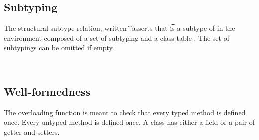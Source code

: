 \documentclass[a4paper,USenglish]{tex/lipics-v2016}
\begin{document}
\subsection{Subtyping}

The structural subtype relation, written \StrSub\M\K\t\tp, asserts that \t
is a subtype of \tp in the environment composed of a set of subtyping \M and
a class table \K.   The set of subtypings can be omitted if empty.

~\\

\begin{mathpar}


\end{mathpar}

\begin{mathpar}


\end{mathpar}

\subsection{Well-formedness}

The overloading function is meant to check that every typed method is
defined once. Every untyped method is defined once. A class has either a
field \f or a pair of getter and setters. \\


\begin{mathpar}
\end{mathpar}
\end{document}
